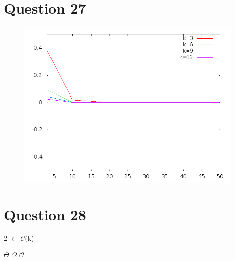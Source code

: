 \documentclass[a4paper,12pt]{report}
\begin{document}
\section*{Question 27}
\begin{figure}[!ht]
	\center
	\includegraphics[scale=0.4]{q27.png}
\end{figure}

\section*{Question 28}
2 $\in$ $\mathcal{O}$(k)




$\Theta$ $\Omega$
$\mathcal{O}$

\newpage
\end{document}
